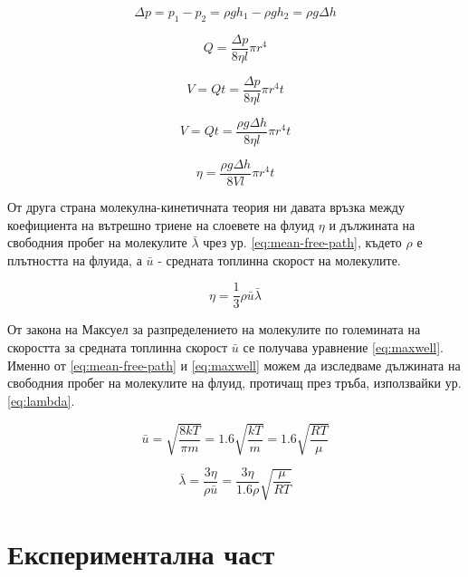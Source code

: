 \documentclass[12pt]{article}
\begin{document}
\begin{equation}\label{eq:delta-p}
    \Delta p = p_1 - p_2 = \rho g h_1 - \rho g h_2 = \rho g \Delta h
\end{equation}

\begin{equation}\label{eq:stream}
    Q = \frac{\Delta p}{8 \eta l} \pi r^4
\end{equation}

\begin{equation}\label{eq:V}
    V = Qt = \frac{\Delta p}{8 \eta l} \pi r^4 t
\end{equation}

\begin{equation}
    V = Qt = \frac{\rho g \Delta h}{8 \eta l} \pi r^4 t
\end{equation}

\begin{equation}\label{eq:work-formula}
    \eta = \frac{\rho g \Delta h}{8 V l} \pi r^4 t
\end{equation}

От друга страна молекулна-кинетичната теория ни давата връзка между коефициента на вътрешно триене на слоевете на флуид $\eta$ и дължината на свободния пробег на молекулите $\bar{\lambda}$ чрез ур. \ref{eq:mean-free-path}, където $\rho$ е плътността на флуида, а $\bar{u}$ - средната топлинна скорост на молекулите.

\begin{equation}\label{eq:mean-free-path}
    \eta = \frac{1}{3}\rho \bar{u} \bar{\lambda}
\end{equation}

От закона на Максуел за разпределението на молекулите по големината на скоростта за средната топлинна скорост $\bar{u}$ се получава уравнение \ref{eq:maxwell}. Именно от \ref{eq:mean-free-path} и \ref{eq:maxwell} можем да изследваме дължината на свободния пробег на молекулите на флуид, протичащ през тръба, използвайки ур. \ref{eq:lambda}. 

\begin{equation}\label{eq:maxwell}
    \bar{u} = \sqrt{\frac{8kT}{\pi m}} = 1.6\sqrt{\frac{kT}{m}} = 1.6\sqrt{\frac{RT}{\mu}}
\end{equation}

\begin{equation}\label{eq:lambda}
    \bar{\lambda} = \frac{3\eta}{\rho \bar{u}} = \frac{3\eta}{1.6\rho}\sqrt{\frac{\mu}{RT}}
\end{equation}
\section{Експериментална част}
\end{document}
